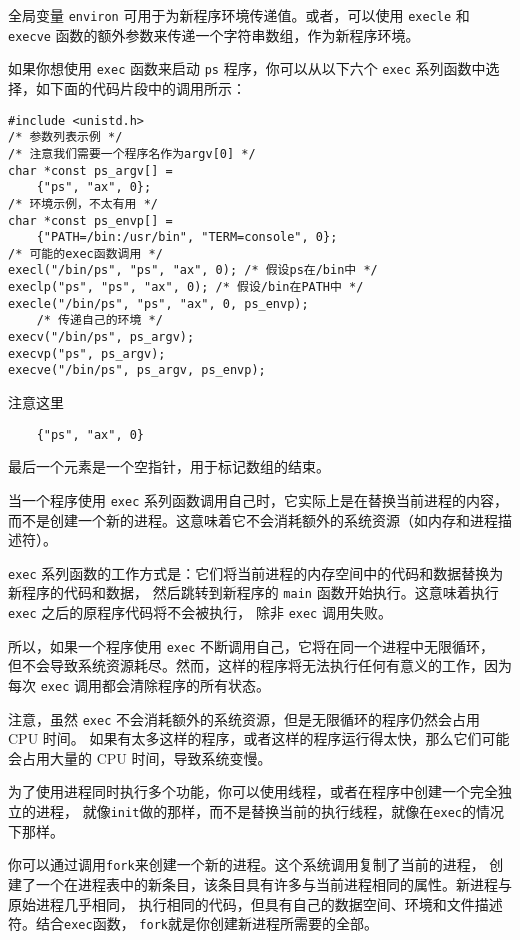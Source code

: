 \documentclass{ctexart}
\begin{document}
全局变量 \texttt{environ} 可用于为新程序环境传递值。或者，可以使用 \texttt{execle} 
和 \texttt{execve} 函数的额外参数来传递一个字符串数组，作为新程序环境。  
      
如果你想使用 \texttt{exec} 函数来启动 \texttt{ps} 程序，你可以从以下六个 
\texttt{exec} 系列函数中选择，如下面的代码片段中的调用所示：  
      
\begin{verbatim}  
#include <unistd.h>  
/* 参数列表示例 */  
/* 注意我们需要一个程序名作为argv[0] */  
char *const ps_argv[] =  
    {"ps", "ax", 0};  
/* 环境示例，不太有用 */  
char *const ps_envp[] =  
    {"PATH=/bin:/usr/bin", "TERM=console", 0};  
/* 可能的exec函数调用 */  
execl("/bin/ps", "ps", "ax", 0); /* 假设ps在/bin中 */  
execlp("ps", "ps", "ax", 0); /* 假设/bin在PATH中 */  
execle("/bin/ps", "ps", "ax", 0, ps_envp); 
    /* 传递自己的环境 */  
execv("/bin/ps", ps_argv);  
execvp("ps", ps_argv);  
execve("/bin/ps", ps_argv, ps_envp);  
\end{verbatim}  

注意这里
\begin{verbatim}
    {"ps", "ax", 0}
\end{verbatim}
最后一个元素是一个空指针，用于标记数组的结束。

当一个程序使用 \verb|exec| 系列函数调用自己时，它实际上是在替换当前进程的内容，
而不是创建一个新的进程。这意味着它不会消耗额外的系统资源（如内存和进程描述符）。

\verb|exec| 系列函数的工作方式是：它们将当前进程的内存空间中的代码和数据替换为新程序的代码和数据，
然后跳转到新程序的 \verb|main| 函数开始执行。这意味着执行 \verb|exec| 之后的原程序代码将不会被执行，
除非 \verb|exec| 调用失败。

所以，如果一个程序使用 \verb|exec| 不断调用自己，它将在同一个进程中无限循环，
但不会导致系统资源耗尽。然而，这样的程序将无法执行任何有意义的工作，因为每次 \verb|exec| 
调用都会清除程序的所有状态。

注意，虽然 \verb|exec| 不会消耗额外的系统资源，但是无限循环的程序仍然会占用 CPU 时间。
如果有太多这样的程序，或者这样的程序运行得太快，那么它们可能会占用大量的 CPU 时间，导致系统变慢。


为了使用进程同时执行多个功能，你可以使用线程，或者在程序中创建一个完全独立的进程，
就像\texttt{init}做的那样，而不是替换当前的执行线程，就像在\texttt{exec}的情况下那样。  
  
你可以通过调用\texttt{fork}来创建一个新的进程。这个系统调用复制了当前的进程，
创建了一个在进程表中的新条目，该条目具有许多与当前进程相同的属性。新进程与原始进程几乎相同，
执行相同的代码，但具有自己的数据空间、环境和文件描述符。结合\texttt{exec}函数，
\texttt{fork}就是你创建新进程所需要的全部。  
  
\end{document}
